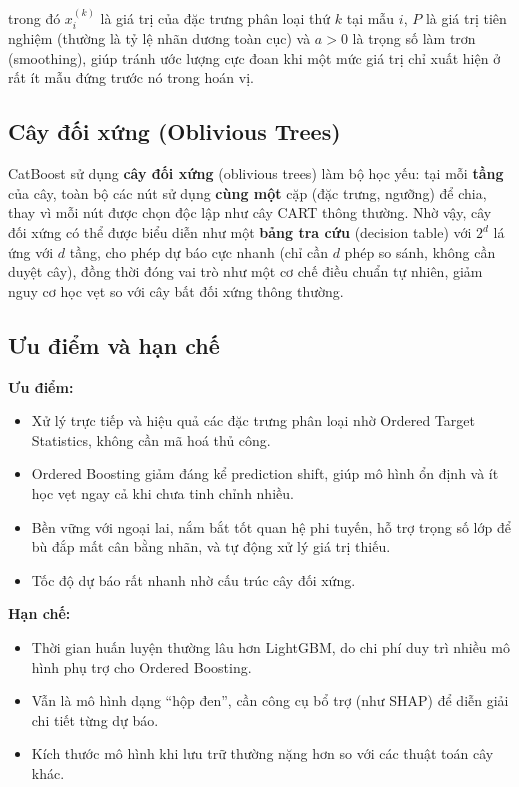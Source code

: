 \documentclass[a4paper]{article}
\begin{document}
trong đó $x_i^{(k)}$ là giá trị của đặc trưng phân loại thứ $k$ tại mẫu $i$,
$P$ là giá trị tiên nghiệm (thường là tỷ lệ nhãn dương toàn cục) và $a > 0$ là
trọng số làm trơn (smoothing), giúp tránh ước lượng cực đoan khi một mức giá
trị chỉ xuất hiện ở rất ít mẫu đứng trước nó trong hoán vị.

\subsection{Cây đối xứng (Oblivious Trees)}

CatBoost sử dụng \textbf{cây đối xứng} (oblivious trees) làm bộ học yếu: tại
mỗi \textbf{tầng} của cây, toàn bộ các nút sử dụng \textbf{cùng một} cặp
(đặc trưng, ngưỡng) để chia, thay vì mỗi nút được chọn độc lập như cây CART
thông thường. Nhờ vậy, cây đối xứng có thể được biểu diễn như một
\textbf{bảng tra cứu} (decision table) với $2^d$ lá ứng với $d$ tầng, cho phép
dự báo cực nhanh (chỉ cần $d$ phép so sánh, không cần duyệt cây), đồng thời
đóng vai trò như một cơ chế điều chuẩn tự nhiên, giảm nguy cơ học vẹt so với
cây bất đối xứng thông thường.

\subsection{Ưu điểm và hạn chế}

\textbf{Ưu điểm:}
\begin{itemize}[leftmargin=*]
  \item Xử lý trực tiếp và hiệu quả các đặc trưng phân loại nhờ Ordered Target
        Statistics, không cần mã hoá thủ công.
  \item Ordered Boosting giảm đáng kể prediction shift, giúp mô hình ổn định
        và ít học vẹt ngay cả khi chưa tinh chỉnh nhiều.
  \item Bền vững với ngoại lai, nắm bắt tốt quan hệ phi tuyến, hỗ trợ trọng số
        lớp để bù đắp mất cân bằng nhãn, và tự động xử lý giá trị thiếu.
  \item Tốc độ dự báo rất nhanh nhờ cấu trúc cây đối xứng.
\end{itemize}

\textbf{Hạn chế:}
\begin{itemize}[leftmargin=*]
  \item Thời gian huấn luyện thường lâu hơn LightGBM, do chi phí duy trì nhiều
        mô hình phụ trợ cho Ordered Boosting.
  \item Vẫn là mô hình dạng ``hộp đen'', cần công cụ bổ trợ (như SHAP) để diễn
        giải chi tiết từng dự báo.
  \item Kích thước mô hình khi lưu trữ thường nặng hơn so với các thuật toán
        cây khác.
\end{itemize}
\end{document}
